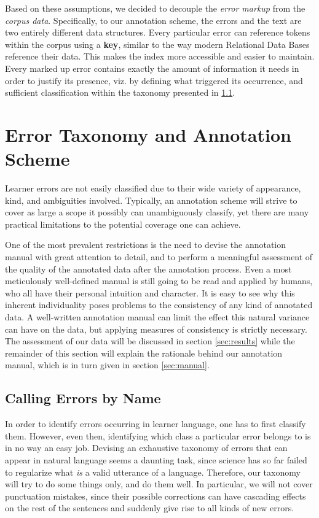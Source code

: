 \documentclass[12pt]{article}
\begin{document}
Based on these assumptions, we decided to decouple the \textit{error markup}
from the \textit{corpus data}. Specifically, to our annotation scheme, the
errors and the text are two entirely different data structures. Every
particular error can reference tokens within the corpus using a \textbf{key},
similar to the way modern Relational Data Bases reference their data. This makes
the index more accessible and easier to maintain. Every marked up error contains exactly
the amount of information it needs in order to justify its presence, viz. by
defining what triggered its occurrence, and sufficient classification within the
taxonomy presented in \ref{sec:taxo}.


\section{Error Taxonomy and Annotation Scheme}\label{sec:scheme}

Learner errors are not easily classified due to their wide variety of
appearance, kind, and ambiguities involved. Typically, an annotation scheme will
strive to cover as large a scope it possibly can unambiguously classify, yet
there are many practical limitations to the potential coverage one can achieve.

One of the most prevalent restrictions is the need to devise the annotation
manual with great attention to detail, and to perform a meaningful assessment of
the quality of the annotated data after the annotation process. Even a most
meticulously well-defined manual is still going to be read and applied by
humans, who all have their personal intuition and character. It is easy to see
why this inherent individuality poses problems to the consistency of any kind of
annotated data. A well-written annotation manual can limit the effect this
natural variance can have on the data, but applying measures of consistency is
strictly necessary. The assessment of our data will be discussed in section
\ref{sec:results} while the remainder of this section will explain the rationale
behind our annotation manual, which is in turn given in section \ref{sec:manual}.

\subsection{Calling Errors by Name}\label{sec:taxo}

In order to identify errors occurring in learner language, one has to first
classify them. However, even then, identifying which class a particular error
belongs to is in no way an easy job. Devising an exhaustive taxonomy of errors
that can appear in natural language seems a daunting task, since science has so
far failed to regularize what \textit{is} a valid utterance of a language.
Therefore, our taxonomy will try to do some things only, and do them well. In
particular, we will not cover punctuation mistakes, since their possible
corrections can have cascading effects on the rest of the sentences and suddenly
give rise to all kinds of new errors.
\end{document}
